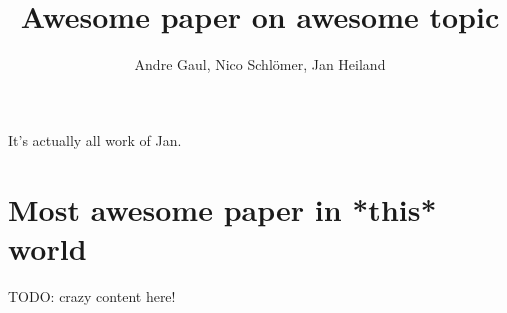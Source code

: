 \documentclass[a4paper,10pt]{article}
\title{Awesome paper on awesome topic}
\author{Andre Gaul, Nico Schlömer, Jan Heiland}
\begin{document}
It's actually all work of Jan.
\maketitle
\tableofcontents

\section{Most awesome paper in *this* world}
TODO: crazy content here!



\end{document}
